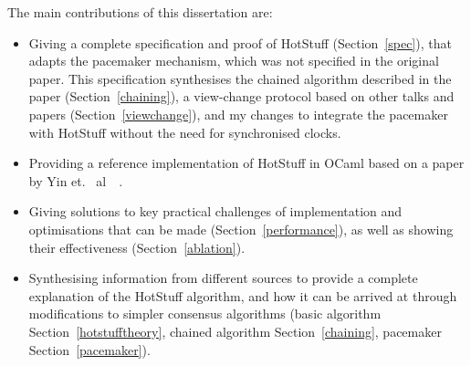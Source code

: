 The main contributions of this dissertation are:
\begin{itemize}
	\item Giving a complete specification and proof of HotStuff (Section~\ref{spec}), that adapts the pacemaker mechanism, which was not specified in the original paper. This specification synthesises the chained algorithm described in the paper (Section~\ref{chaining}), a view-change protocol based on other talks and papers (Section~\ref{viewchange}), and my changes to integrate the pacemaker with HotStuff without the need for synchronised clocks.
	\item Providing a reference implementation of HotStuff in OCaml based on a paper by Yin et. ~al~~\cite{yinHotStuffBFTConsensus2019}.
	\item Giving solutions to key practical challenges of implementation and optimisations that can be made (Section~\ref{performance}), as well as showing their effectiveness (Section~\ref{ablation}).
	\item Synthesising information from different sources to provide a complete explanation of the HotStuff algorithm, and how it can be arrived at through modifications to simpler consensus algorithms (basic algorithm Section~\ref{hotstufftheory}, chained algorithm Section~\ref{chaining}, pacemaker Section~\ref{pacemaker}).
\end{itemize}